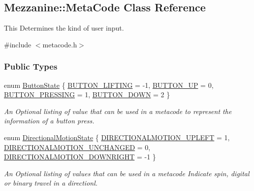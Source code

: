 \hypertarget{classMezzanine_1_1MetaCode}{
\subsection{Mezzanine::MetaCode Class Reference}
\label{classMezzanine_1_1MetaCode}
}


This Determines the kind of user input.  




{\ttfamily \#include $<$metacode.h$>$}

\subsubsection*{Public Types}
\begin{DoxyCompactItemize}
\item 
enum \hyperlink{classMezzanine_1_1MetaCode_a65b6d86ef846369bd8f3fd944a455fd0}{ButtonState} \{ \hyperlink{classMezzanine_1_1MetaCode_a65b6d86ef846369bd8f3fd944a455fd0a07ca860b5b6b505052022d842f155080}{BUTTON\_\-LIFTING} =  -\/1, 
\hyperlink{classMezzanine_1_1MetaCode_a65b6d86ef846369bd8f3fd944a455fd0a100e16dc4d4e866189e42ab81398f6e9}{BUTTON\_\-UP} =  0, 
\hyperlink{classMezzanine_1_1MetaCode_a65b6d86ef846369bd8f3fd944a455fd0a9150dbdf88f3013383a72366904cb749}{BUTTON\_\-PRESSING} =  1, 
\hyperlink{classMezzanine_1_1MetaCode_a65b6d86ef846369bd8f3fd944a455fd0af66afc958f5eb62b8b836897d062b62b}{BUTTON\_\-DOWN} =  2
 \}
\begin{DoxyCompactList}\small\item\em An Optional listing of value that can be used in a metacode to represent the information of a button press. \item\end{DoxyCompactList}\item 
enum \hyperlink{classMezzanine_1_1MetaCode_ad37143a88b8c94cb6b2f40f5d66104ad}{DirectionalMotionState} \{ \hyperlink{classMezzanine_1_1MetaCode_ad37143a88b8c94cb6b2f40f5d66104adaab0a7592ad86de4ba170afc0d3c99ead}{DIRECTIONALMOTION\_\-UPLEFT} =  1, 
\hyperlink{classMezzanine_1_1MetaCode_ad37143a88b8c94cb6b2f40f5d66104adadd21933bb9cb8f213ed01ff59dd04f37}{DIRECTIONALMOTION\_\-UNCHANGED} =  0, 
\hyperlink{classMezzanine_1_1MetaCode_ad37143a88b8c94cb6b2f40f5d66104ada11a3bc63626fe380e329ea5983876753}{DIRECTIONALMOTION\_\-DOWNRIGHT} =  -\/1
 \}
\begin{DoxyCompactList}\small\item\em An Optional listing of values that can be used in a metacode Indicate spin, digital or binary travel in a directionl. \item\end{DoxyCompactList}\item 

\end{DoxyCompactItemize}
